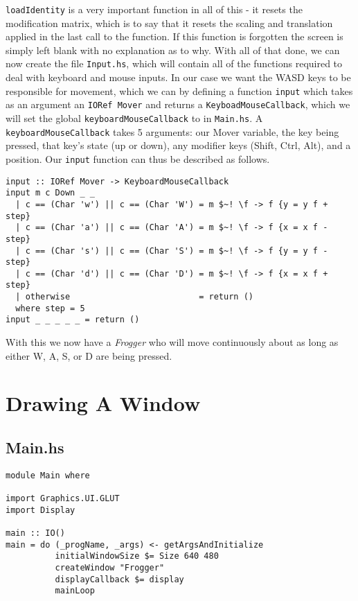 \documentclass[12pt, a4paper]{report}
\begin{document}
\verb|loadIdentity| is a very important function in all of this - it resets the modification matrix, which is to say that it resets the scaling and translation applied in the last call to the function.
If this function is forgotten the screen is simply left blank with no explanation as to why.
With all of that done, we can now create the file \verb|Input.hs|, which will contain all of the functions required to deal with keyboard and mouse inputs.
In our case we want the WASD keys to be responsible for movement, which we can by defining a function \verb|input| which takes as an argument an \verb|IORef Mover| and returns a \verb|KeyboadMouseCallback|, which we will set the global \verb|keyboardMouseCallback| to in \verb|Main.hs|.
A \verb|keyboardMouseCallback| takes 5 arguments: our Mover variable, the key being pressed, that key's state (up or down), any modifier keys (Shift, Ctrl, Alt), and a position.
Our \verb|input| function can thus be described as follows.

\begin{lstlisting}[xleftmargin=-0.1\textwidth, xrightmargin=-0.1\textwidth]
input :: IORef Mover -> KeyboardMouseCallback
input m c Down _ _ 
  | c == (Char 'w') || c == (Char 'W') = m $~! \f -> f {y = y f + step}
  | c == (Char 'a') || c == (Char 'A') = m $~! \f -> f {x = x f - step}
  | c == (Char 's') || c == (Char 'S') = m $~! \f -> f {y = y f - step}
  | c == (Char 'd') || c == (Char 'D') = m $~! \f -> f {x = x f + step}
  | otherwise                          = return ()
  where step = 5
input _ _ _ _ _ = return ()
\end{lstlisting}

With this we now have a \textit{Frogger} who will move continuously about as long as either W, A, S, or D are being pressed.

\pagebreak
\appendix

\section{Drawing A Window}
\subsection{Main.hs}
\begin{lstlisting}
module Main where

import Graphics.UI.GLUT
import Display

main :: IO()
main = do (_progName, _args) <- getArgsAndInitialize
          initialWindowSize $= Size 640 480
          createWindow "Frogger"
          displayCallback $= display
          mainLoop
\end{lstlisting}
\end{document}
